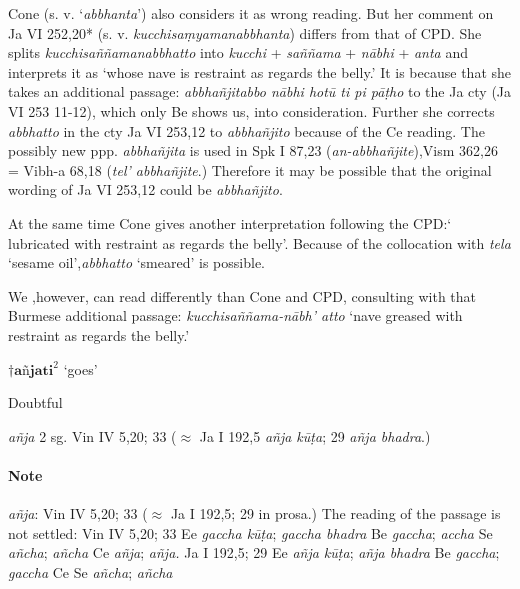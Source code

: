 \documentclass[11pt]{article}
\newcommand*\ṛ{r\symbol{"325}}
\newcommand*\Ṛ{R\symbol{"325}}
\newcommand*\ṝ{r\symbol{"304}\symbol{"325}}
\newcommand*\Ṝ{R\symbol{"304}\symbol{"325}}
\newcommand*\ḷ{l\symbol{"325}}
\newcommand*\ḹ{l\symbol{"304}\symbol{"325}}
\newcommand*\Ḷ{L\symbol{"325}}
\newcommand*\Ḹ{L\symbol{"304}\symbol{"325}}
\begin{document}
Cone (s. v. `\textit{abbhanta}') also considers it as wrong reading.
But her comment on Ja VI 252,20* (s. v. \textit{kucchisaṃyamanabbhanta}) differs from that of CPD.
She splits \textit{kucchisaññamanabbhatto} into \textit{kucchi} + \textit{saññama} + \textit{nābhi} + \textit{anta} and interprets it as `whose nave is restraint as regards the belly.'
It is because that she takes an additional passage: \textit{abbhañjitabbo nābhi hotū ti pi pāṭho} to the Ja cty (Ja VI 253 11-12),
which only Be shows us,
into consideration.
Further she corrects \textit{abbhatto} in the cty Ja VI 253,12 to \textit{abbhañjito} because of the Ce reading.
The possibly new ppp. \textit{abbhañjita} is used in Spk I 87,23 (\textit{an-abbhañjite}),Vism 362,26 = Vibh-a 68,18 (\textit{tel' abbhañjite}.)
Therefore it may be possible that the original wording of Ja VI 253,12 could be \textit{abbhañjito}.

At the same time Cone gives another interpretation following the CPD:` lubricated with restraint as regards the belly'.
Because of the collocation with \textit{tela} `sesame oil',\textit{abbhatto} `smeared' is possible.

We ,however, can read differently than Cone and CPD,
consulting with that Burmese additional passage:
\textit{kucchisaññama-nābh' atto} `nave greased with restraint as regards the belly.'


%
%
\begin{center}
{\Large
$†\textbf{añjati}^2$ `goes'
}
\end{center}

Doubtful

\begin{description}[leftmargin=\parindent]
\item[imper.] \textit{añja} 2 sg. Vin IV 5,20; 33 ($\approx$ Ja I 192,5 \textit{añja kūṭa}; 29 \textit{añja bhadra}.)
\end{description}

\paragraph*{Note}
\textit{añja}: Vin IV 5,20; 33 ($\approx$ Ja I 192,5; 29 in prosa.)
The reading of the passage is not settled:
Vin IV 5,20; 33 Ee \textit{gaccha kūṭa}; \textit{gaccha bhadra} Be \textit{gaccha}; \textit{accha} Se \textit{añcha}; \textit{añcha}
Ce \textit{añja}; \textit{añja.} 
Ja I 192,5; 29 Ee \textit{añja kūṭa}; \textit{añja bhadra} Be \textit{gaccha}; \textit{gaccha} Ce Se \textit{añcha}; \textit{añcha} 
\end{document}
